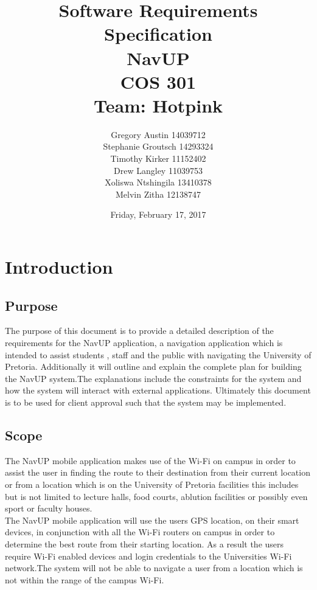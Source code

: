 \documentclass[11pt,a4paper]{article}
\title{Software Requirements Specification \\ NavUP \\ COS 301 \\ Team: Hotpink}
\date{Friday, February 17, 2017}
\author{Gregory Austin 14039712 \\ Stephanie Groutsch 14293324 \\ Timothy Kirker 11152402 \\ Drew Langley 11039753 \\ Xoliswa Ntshingila 13410378
\\ Melvin Zitha 12138747}
\begin{document}
\maketitle


\newpage
\section{Introduction}
	\subsection{Purpose}
	The purpose of this document is to provide a detailed description of the requirements for the NavUP application, a navigation application which is intended to assist students , staff and the  public with navigating the University of Pretoria. Additionally it will outline and explain the complete plan for building the NavUP system.The explanations include the constraints for the system and how the system will interact with external applications. Ultimately this document is to be used for client approval such that the system may be implemented.


	\subsection{Scope}
The NavUP mobile application makes use of the Wi-Fi on campus in order to assist the user in finding the route to their destination from their current location or from a location which is on the University of Pretoria facilities this includes but is not limited to lecture halls, food courts, ablution facilities or possibly even sport or faculty houses. 
\\

The NavUP mobile application will use the users GPS location, on their smart devices, in conjunction with all the Wi-Fi routers on campus in order to determine the best route from their starting location. As a result the users require Wi-Fi enabled devices and login credentials to the Universities Wi-Fi network.The system will not be able to navigate a user from a location which is not within the range of the campus Wi-Fi.
\\
\end{document}
